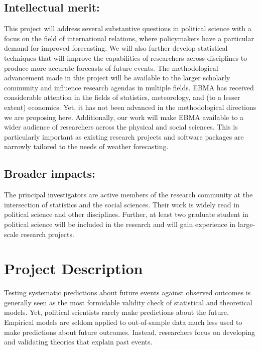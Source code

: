 \documentclass[pdftex,12pt,fullpage,oneside]{amsart}
\begin{document}
\subsection*{Intellectual merit:} 
This project will address several substantive questions in political
science with a focus on the field of international relations, where
policymakers have a particular demand for improved forecasting.  We
will also further develop statistical techniques that will improve the
capabilities of researchers across disciplines to produce more
accurate forecasts of future events. The methodological advancement
made in this project will be available to the larger scholarly
community and influence research agendas in multiple fields.  EBMA has
received considerable attention in the fields of statistics,
meteorology, and (to a lesser extent) economics.  Yet, it has not been
advanced in the methodological directions we are proposing here.
Additionally, our work will make EBMA available to a wider
audience of researchers across the physical and social sciences.  This
is particularly important as existing research projects and software
packages are narrowly tailored to the needs of weather forecasting.

\subsection*{Broader impacts:}
The principal investigators are active members of the research
community at the intersection of statistics and the social
sciences. Their work is widely read in political science and other
disciplines. Further, at least two graduate student in political
science will be included in the research and will gain experience in
large-scale research projects.

\newpage
\setcounter{page}{1}

\section*{Project Description}

Testing systematic predictions about future events against observed
outcomes is generally seen as the most formidable validity check of
statistical and theoretical models.  Yet, political scientists rarely
make predictions about the future.  Empirical models are seldom
applied to out-of-sample data much less used to make predictions about
future outcomes. Instead, researchers focus on developing and
validating theories that explain past events.
\end{document}
